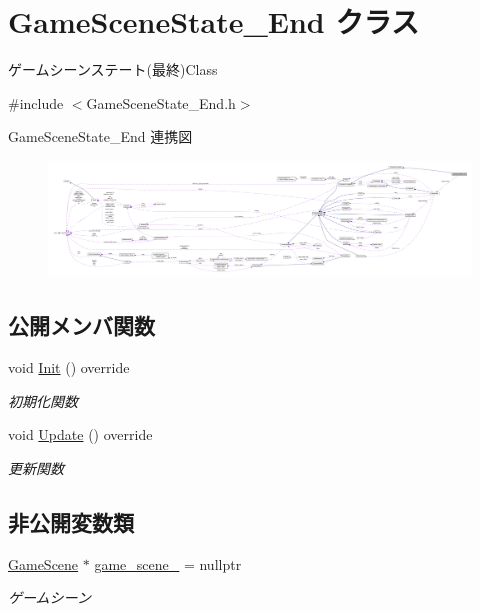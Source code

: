 \hypertarget{class_game_scene_state___end}{}\section{Game\+Scene\+State\+\_\+\+End クラス}
\label{class_game_scene_state___end}


ゲームシーンステート(最終)Class  




{\ttfamily \#include $<$Game\+Scene\+State\+\_\+\+End.\+h$>$}



Game\+Scene\+State\+\_\+\+End 連携図\nopagebreak
\begin{figure}[H]
\begin{center}
\leavevmode
\includegraphics[width=350pt]{class_game_scene_state___end__coll__graph}
\end{center}
\end{figure}
\subsection*{公開メンバ関数}
\begin{DoxyCompactItemize}
\item 
void \mbox{\hyperlink{class_game_scene_state___end_a3b5c24eb6949215da331a20bdfbc55ae}{Init}} () override
\begin{DoxyCompactList}\small\item\em 初期化関数 \end{DoxyCompactList}\item 
void \mbox{\hyperlink{class_game_scene_state___end_a969c3c1ec9618cb495f49bc89bc10067}{Update}} () override
\begin{DoxyCompactList}\small\item\em 更新関数 \end{DoxyCompactList}\end{DoxyCompactItemize}
\subsection*{非公開変数類}
\begin{DoxyCompactItemize}
\item 
\mbox{\hyperlink{class_game_scene}{Game\+Scene}} $\ast$ \mbox{\hyperlink{class_game_scene_state___end_ac66be857d4985555528ccb7c3b7d9a2d}{game\+\_\+scene\+\_\+}} = nullptr
\begin{DoxyCompactList}\small\item\em ゲームシーン \end{DoxyCompactList}\end{DoxyCompactItemize}


